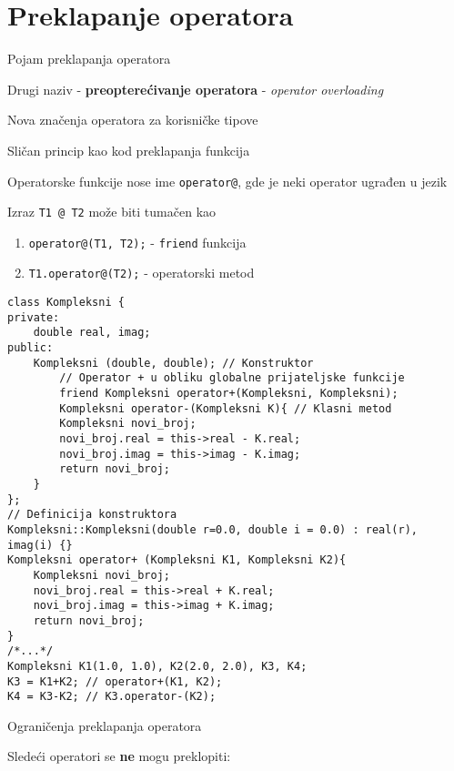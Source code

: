 \documentclass{article}
\newenvironment{xitemize}{%
    
    \itemize
    \larger
}{%
    \enditemize
}
\let\olditemize\itemize
\let\endolditemize\enditemize
\renewenvironment{itemize}{%
    \smaller
    \olditemize
}{%
    \endolditemize
}
\providecommand{\inlinecode}[1]{\texttt{#1}}
\begin{document}
\section{Preklapanje operatora}
\begin{xitemize}
\item Pojam preklapanja operatora
\begin{itemize}
    \item Drugi naziv - \textbf{preopterećivanje operatora} - \textit{operator overloading}
    \item Nova značenja operatora za korisničke tipove
    \item Sličan princip kao kod preklapanja funkcija
    \item Operatorske funkcije nose ime \inlinecode{operator@}, gde je \inlinecode@ neki operator ugrađen u jezik
    \item Izraz \inlinecode{T1 @ T2} može biti tumačen kao
    \begin{enumerate}
        \item \inlinecode{operator@(T1, T2);} - \inlinecode{friend} funkcija
        \item \inlinecode{T1.operator@(T2);} - operatorski metod
    \end{enumerate}
    \begin{lstlisting}
class Kompleksni {
private:
    double real, imag;
public:
    Kompleksni (double, double); // Konstruktor
        // Operator + u obliku globalne prijateljske funkcije
        friend Kompleksni operator+(Kompleksni, Kompleksni); 
        Kompleksni operator-(Kompleksni K){ // Klasni metod
        Kompleksni novi_broj;
        novi_broj.real = this->real - K.real;
        novi_broj.imag = this->imag - K.imag;
        return novi_broj;
    }
};
// Definicija konstruktora
Kompleksni::Kompleksni(double r=0.0, double i = 0.0) : real(r), imag(i) {} 
Kompleksni operator+ (Kompleksni K1, Kompleksni K2){
    Kompleksni novi_broj;
    novi_broj.real = this->real + K.real;
    novi_broj.imag = this->imag + K.imag;
    return novi_broj;
}
/*...*/
Kompleksni K1(1.0, 1.0), K2(2.0, 2.0), K3, K4;
K3 = K1+K2; // operator+(K1, K2);
K4 = K3-K2; // K3.operator-(K2);
    \end{lstlisting}
\end{itemize}
\item Ograničenja preklapanja operatora
\begin{itemize}
    \item Sledeći operatori se \textbf{ne} mogu preklopiti:\\

\end{itemize}
\end{xitemize}
\end{document}
